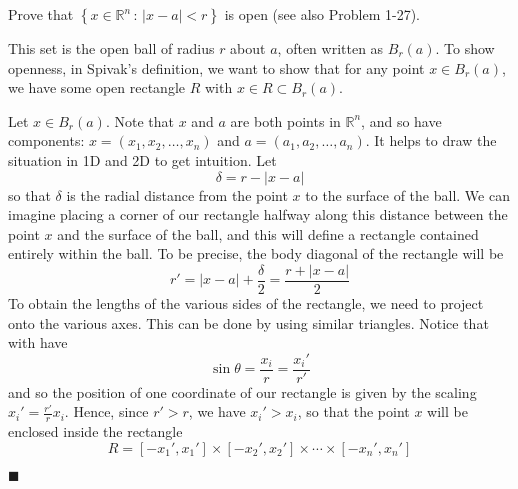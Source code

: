 \documentclass[12pt]{article}
\renewcommand{\qed}{\hfill$\blacksquare$}
\renewenvironment{proof}{\begin{addmargin}[1em]{0em}\begin{newproof}}{\end{newproof}\end{addmargin}\qed}
\newenvironment{problem}[2][Problem]{\begin{trivlist}
\item[\hskip \labelsep {\bfseries #1}\hskip \labelsep {\bfseries #2.}]}{\end{trivlist}}
\begin{document}
 
 \begin{problem}{1-15}
 Prove that $\left\{ x\in\mathbb{R}^n \, : \, \left|x-a\right| < r\right\}$ is open (see also Problem 1-27).
 \end{problem}
 \begin{proof}
 This set is the open ball of radius $r$ about $a$, often written as $B_r\left(a\right)$. To show openness, in Spivak's definition, we want to show that for any point $x\in B_r\left(a\right)$, we have some open rectangle $R$ with $x \in R \subset B_r\left(a\right)$.
 
 Let $x \in B_r\left(a\right)$. Note that $x$ and $a$ are both points in $\mathbb{R}^n$, and so have components: $x = \left(x_1,x_2,\ldots, x_n\right)$ and $a=\left(a_1,a_2,\ldots,a_n\right)$. It helps to draw the situation in 1D and 2D to get intuition. Let $$ \delta = r - \left|x-a\right|$$ so that $\delta$ is the radial distance from the point $x$ to the surface of the ball. We can imagine placing a corner of our rectangle halfway along this distance between the point $x$ and the surface of the ball, and this will define a rectangle contained entirely within the ball. To be precise, the body diagonal of the rectangle will be $$ r' = \left|x-a\right| + \frac{\delta}{2} = \frac{r + \left|x-a\right|}{2}$$ To obtain the lengths of the various sides of the rectangle, we need to project onto the various axes. This can be done by using similar triangles. Notice that with have $$ \sin \theta = \frac{x_i}{r} = \frac{x_i'}{r'} $$ and so the position of one coordinate of our rectangle is given by the scaling $x_i ' =\frac{r'}{r} x_i$. Hence, since $r' > r$, we have $x_i ' > x_i$, so that the point $x$ will be enclosed inside the rectangle $$ R = \left[-x_1', x_1'\right] \times\left[-x_2', x_2'\right]\times \cdots \times \left[-x_n', x_n'\right] $$
 \end{proof}
 
 
 
 
 
 
 
 
 
\end{document}
